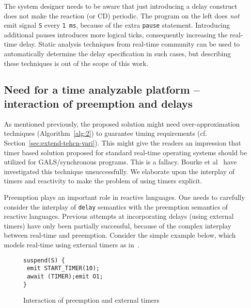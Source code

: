 The system designer needs to be aware that just introducing a delay
construct does not make the reaction (or CD) periodic. The program on
the left does \textit{not} emit signal \texttt{S} every \texttt{1 ms},
because of the extra \texttt{pause} statement. Introducing additional
pauses introduces more logical ticks, consequently increasing the
real-time delay. Static analysis techniques from real-time community can
be used to automatically determine the delay specification in such
cases, but describing these techniques is out of the scope of this work.

\subsection{Need for a time analyzable platform -- interaction of
  preemption and delays}
\label{sec:inter-preempt-delays}

As mentioned previously, the proposed solution might need
over-approximation techniques (Algorithm~\ref{alg:2}) to guarantee
timing requirements (cf. Section~\ref{sec:extend-tehcn-vari}). This
might give the readers an impression that timer based solution proposed
for standard real-time operating systems should be utilized for
GALS/synchronous programs. This is a fallacy. Bourke et
al~\cite{Bourke2009a} have investigated this technique
unsuccessfully. We elaborate upon the interplay of timers and reactivity
to make the problem of using timers explicit.

Preemption plays an important role in reactive languages. One needs to
carefully consider the interplay of \texttt{delay} semantics with the
preemption semantics of reactive languages. Previous attempts at
incorporating delays (using external timers) have only been partially
successful, because of the complex interplay between real-time and
preemption. Consider the simple example below, which models real-time
using external timers as in~\cite{rsh94}. 

\begin{figure}[h!]
  \centering
	\vspace{-10pt}
		\begin{lstlisting}[style=sysj,basicstyle=\normalsize\ttfamily,morekeywords={emit,trap,pause,exit,delay,suspend}]
suspend(S) {
 emit START_TIMER(10); 
 await (TIMER);emit O1;
}
		\end{lstlisting}
  \caption{Interaction of preemption and external timers}
  \label{fig:preemp}
	\vspace{-10pt}
\end{figure}


